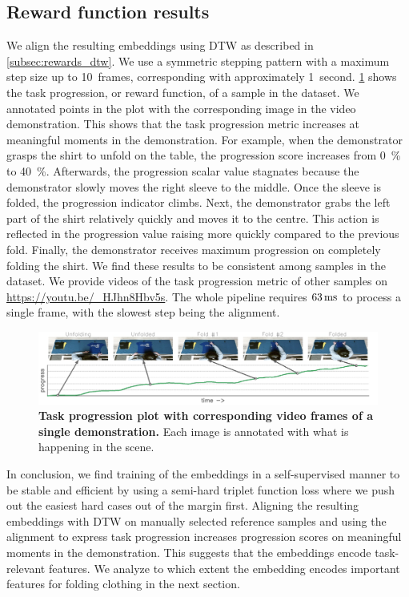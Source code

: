 \documentclass[\home/main.tex]{subfiles}
\begin{document}
\subsection{Reward function results}
We align the resulting embeddings using DTW as described in \cref{subsec:rewards_dtw}. We use a symmetric stepping pattern \autocite{Rabiner1993} with a maximum step size up to 10~frames, corresponding with approximately 1~second. \cref{fig:rewards_reward_plot} shows the task progression, or reward function, of a sample in the dataset. We annotated points in the plot with the corresponding image in the video demonstration. This shows that the task progression metric increases at meaningful moments in the demonstration. For example, when the demonstrator grasps the shirt to unfold on the table, the progression score increases from \qty{0}{\percent} to \qty{40}{\percent}. Afterwards, the progression scalar value stagnates because the demonstrator slowly moves the right sleeve to the middle. Once the sleeve is folded, the progression indicator climbs. Next, the demonstrator grabs the left part of the shirt relatively quickly and moves it to the centre. This action is reflected in the progression value raising more quickly compared to the previous fold. Finally, the demonstrator receives maximum progression on completely folding the shirt. We find these results to be consistent among samples in the dataset. We provide videos of the task progression metric of other samples on \url{https://youtu.be/_HJhn8Hbv5s}. The whole pipeline requires $63\mskip\thinmuskip \text{ms}$ to process a single frame, with the slowest step being the alignment.

\begin{figure}
    \centering
    \includegraphics[width=\textwidth,keepaspectratio]{figures/figs_cases_paper_reward_plot_383.jpg}
    \caption[Task progression plot with corresponding video frames of a single demonstration]{\textbf{Task progression plot with corresponding video frames of a single demonstration.} Each image is annotated with what is happening in the scene.}
    \label{fig:rewards_reward_plot}
\end{figure}

In conclusion, we find training of the embeddings in a self-supervised manner to be stable and efficient by using a semi-hard triplet function loss where we push out the easiest hard cases out of the margin first. Aligning the resulting embeddings with DTW on manually selected reference samples and using the alignment to express task progression increases progression scores on meaningful moments in the demonstration. This suggests that the embeddings encode task-relevant features. We analyze to which extent the embedding encodes important features for folding clothing in the next section.
\end{document}
